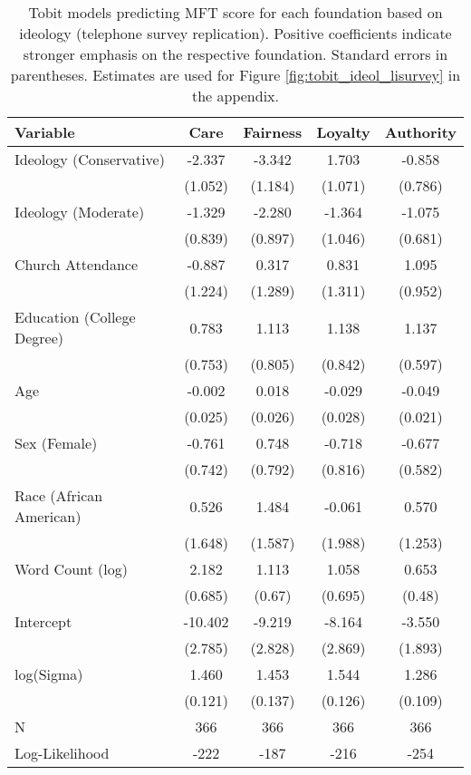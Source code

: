 \begin{table}[ht]
\centering
\caption[Tobit models predicting MFT score for each foundation based 
           on ideology (telephone survey replication)]{Tobit models predicting MFT score for each foundation based 
           on ideology (telephone survey replication). Positive coefficients indicate stronger emphasis on the respective 
           foundation. Standard errors in parentheses. Estimates are used for Figure 
           \ref{fig:tobit_ideol_lisurvey} in the appendix.} 
\label{tab:tobit_ideol_lisurvey}
\begingroup\footnotesize
\begin{tabular}{lcccc}
  \hline
Variable & Care & Fairness & Loyalty & Authority \\ 
  \hline
Ideology (Conservative) &  -2.337 & -3.342 &  1.703 & -0.858 \\ 
   & (1.052) & (1.184) & (1.071) & (0.786) \\ 
  Ideology (Moderate) &  -1.329 & -2.280 & -1.364 & -1.075 \\ 
   & (0.839) & (0.897) & (1.046) & (0.681) \\ 
  Church Attendance &  -0.887 &  0.317 &  0.831 &  1.095 \\ 
   & (1.224) & (1.289) & (1.311) & (0.952) \\ 
  Education (College Degree) &   0.783 &  1.113 &  1.138 &  1.137 \\ 
   & (0.753) & (0.805) & (0.842) & (0.597) \\ 
  Age &  -0.002 &  0.018 & -0.029 & -0.049 \\ 
   & (0.025) & (0.026) & (0.028) & (0.021) \\ 
  Sex (Female) &  -0.761 &  0.748 & -0.718 & -0.677 \\ 
   & (0.742) & (0.792) & (0.816) & (0.582) \\ 
  Race (African American) &   0.526 &  1.484 & -0.061 &  0.570 \\ 
   & (1.648) & (1.587) & (1.988) & (1.253) \\ 
  Word Count (log) &   2.182 &  1.113 &  1.058 &  0.653 \\ 
   & (0.685) & (0.67) & (0.695) & (0.48) \\ 
  Intercept & -10.402 & -9.219 & -8.164 & -3.550 \\ 
   & (2.785) & (2.828) & (2.869) & (1.893) \\ 
  log(Sigma) &   1.460 &  1.453 &  1.544 &  1.286 \\ 
   & (0.121) & (0.137) & (0.126) & (0.109) \\ 
   \hline
N & 366 & 366 & 366 & 366 \\ 
  Log-Likelihood & -222 & -187 & -216 & -254 \\ 
   \hline
\end{tabular}
\endgroup
\end{table}
